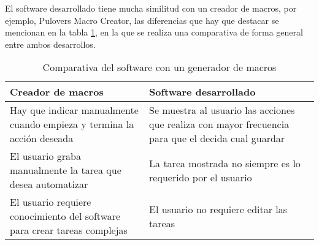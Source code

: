 El software desarrollado tiene mucha similitud con un creador de macros, por 
 ejemplo, Pulovers Macro Creator, las diferencias que hay que destacar se 
 mencionan en la tabla \ref{vsmacros}, en la que se realiza una comparativa de 
 forma general entre ambos desarrollos.
 

\begin{table}[h]
\centering
\begin{tabular}{m{6cm}|m{6cm}}
\hline
Creador de macros 	&	Software desarrollado \\
\hline
Hay que indicar manualmente cuando empieza y termina la acci\'on deseada	
 &	
Se muestra al usuario las acciones que realiza con mayor frecuencia para que
  el decida cual guardar\\
\hline

El usuario graba manualmente la tarea que desea automatizar	
 &
La tarea mostrada no siempre es lo requerido por el usuario\\
\hline

El usuario requiere conocimiento del software para crear tareas complejas 	
 &
El usuario no requiere editar las tareas\\
\hline
\end{tabular}
\caption{Comparativa del software con un generador de macros}
\label{vsmacros}
\end{table}


